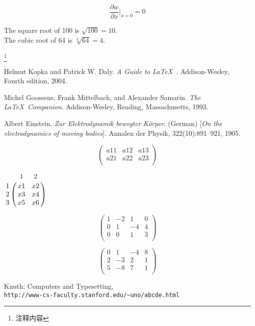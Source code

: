 \documentclass[12pt, letterpaper]{book}
\begin{document}
$$
\frac{\partial w}{\partial x}\Big |_{x=0} = 0 
$$

The square root of 100 is $\sqrt{100}=10$. 
\\
The cubic root of 64 is $\sqrt[3]{64}=4$.

\footnote{注释内容}



\newpage
 \begin{thebibliography}{9}
Helmut Kopka and Patrick W. Daly. 
\textit{A Guide to \LaTeX\ }. 
Addison-Wesley, Fourth edition, 2004.


Michel Goossens, Frank Mittelbach, and Alexander Samarin. 
\textit{The \LaTeX\ Companion}. 
Addison-Wesley, Reading, Massachusetts, 1993.
 
Albert Einstein. 
\textit{Zur Elektrodynamik bewegter K{\"o}rper}. (German) 
[\textit{On the electrodynamics of moving bodies}]. 
Annalen der Physik, 322(10):891–921, 1905.
 

\newpage
\begin{equation}       %
\left(                 %
  \begin{array}{ccc}   %
    a11 & a12 & a13\\  %
    a21 & a22 & a23\\  %
  \end{array}
\right)                 %
\end{equation}


$\bordermatrix{%
& 1 & 2 \cr
1 & x1 & x2 \cr
2 & x3 & x4 \cr
3 & x5 & x6
}$


\newpage
\begin{equation}       %
\left(                 %
  \begin{array}{cccc}   %
    1 & -2 & 1  & 0 \\  %
    0 & 1 & -4 & 4 \\ %
    0 & 0 & 1 & 3 \\  %
  \end{array}
\right)                 %
\end{equation}

\begin{equation}       %
\left(                 %
  \begin{array}{cccc}   %
    0 & 1 & -4 & 8 \\  %
    2 & -3 & 2 & 1 \\ %
    5 & -8 & 7 & 1 \\  %
  \end{array}
\right)                 %
\end{equation}


\newpage
\newpage
\newpage
\newpage
\newpage
\newpage
\newpage
\newpage
\newpage
\newpage
\newpage

\newpage
{} 
Knuth: Computers and Typesetting,
\\\texttt{http://www-cs-faculty.stanford.edu/\~{}uno/abcde.html}
\end{thebibliography}
\end{document}
